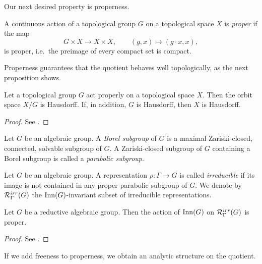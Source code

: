 Our next desired property is properness.

\begin{definition}
    A continuous action of a topological group $G$ on a topological space $X$ is \emph{proper} if the map
    \[
        G \times X \to X \times X, \qquad (g, x) \mapsto (g \cdot x, x),
    \]
    is proper, i.e.\ the preimage of every compact set is compact.
\end{definition}

Properness guarantees that the quotient behaves well topologically, as the next proposition shows.

\begin{proposition}\label{prop:proper-hausdorff}
    Let a topological group $G$ act properly on a topological space $X$. Then the orbit space $X/G$ is Hausdorff. If, in addition, $G$ is Hausdorff, then $X$ is Hausdorff.
\end{proposition}

\begin{proof}
    See \cite[Prop.~3]{Bourbaki1967-qa}.
\end{proof}

\begin{definition}
    Let $G$ be an algebraic group. A \emph{Borel subgroup} of $G$ is a maximal Zariski-closed, connected, solvable subgroup of $G$. A Zariski-closed subgroup of $G$ containing a Borel subgroup is called a \emph{parabolic subgroup}.
\end{definition}

\begin{definition}
    Let $G$ be an algebraic group. A representation $\rho : \Gamma \to G$ is called \emph{irreducible} if its image is not contained in any proper parabolic subgroup of $G$. We denote by $\RepVar{\Gamma}{G}[irr]$ the $\operatorname{Inn}(G)$-invariant subset of irreducible representations.
\end{definition}

\begin{theorem}\label{thm:proper-action}
    Let $G$ be a reductive algebraic group. Then the action of $\operatorname{Inn}(G)$ on $\RepVar{\Gamma}{G}[irr]$ is proper.
\end{theorem}

\begin{proof}
    See \cite[Prop.~1.1]{JohnsonDennis1987DSAt}.
\end{proof}

If we add freeness to properness, we obtain an analytic structure on the quotient.

